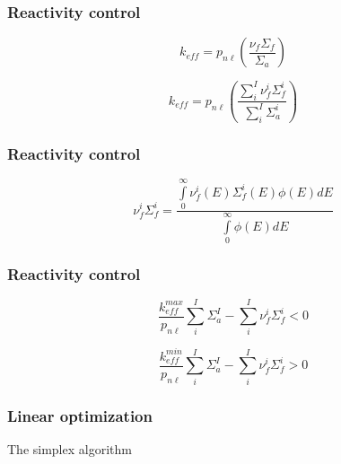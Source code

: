 \documentclass{beamer}
\begin{document}
\begin{frame}
\frametitle{Reactivity control}

    \begin{equation}
    \label{reactivity}
        k_{eff} = p_{n\ell}\left(\frac{\nu_{f}\Sigma_{f}}{\Sigma_{a}}\right)
    \end{equation}

    \begin{equation}
    \label{reactivity_sum}
        k_{eff} = p_{n\ell}\left(\frac{\sum\limits_{i}^{I}\nu_{f}^{i}\Sigma_{f}^{i}}{\sum\limits_{i}^{I}\Sigma_{a}^{i}}\right)
    \end{equation}

\end{frame}

\begin{frame}
\frametitle{Reactivity control}

    \begin{equation}
    \label{nufis}
        \nu_{f}^{i}\Sigma_{f}^{i} = \frac{\int\limits_{0}^{\infty}\nu_{f}^{i}(E)\Sigma_{f}^{i}(E)\phi(E)dE}{\int\limits_{0}^{\infty}\phi(E)dE}
    \end{equation}

\end{frame}

\begin{frame}
\frametitle{Reactivity control}

    \begin{equation}
    \label{max_reac}
        \frac{k_{eff}^{max}}{p_{n\ell}}\sum\limits_{i}^{I}\Sigma_{a}^{I} - \sum\limits_{i}^{I}\nu_{f}^{i}\Sigma_{f}^{i} < 0
    \end{equation}

    \begin{equation}
    \label{max_reac}
        \frac{k_{eff}^{min}}{p_{n\ell}}\sum\limits_{i}^{I}\Sigma_{a}^{I} - \sum\limits_{i}^{I}\nu_{f}^{i}\Sigma_{f}^{i} > 0   
    \end{equation}

\end{frame}

\begin{frame}
\frametitle{Linear optimization}

    The simplex algorithm

\end{frame}
\end{document}
